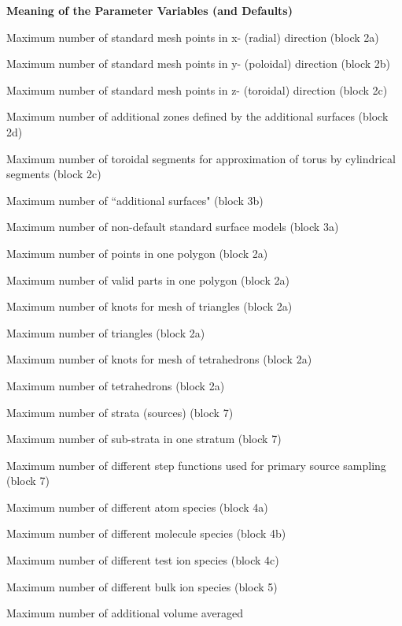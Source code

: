 {\bf Meaning of the Parameter Variables (and Defaults)}
\begin{list}{ }{}
\item[{\bf N1ST }]  Maximum number of standard mesh points in x-
(radial) direction (block 2a)
\item[{\bf N2ND }] Maximum number of standard mesh points in y-
(poloidal) direction (block 2b)
\item[{\bf N3RD }] Maximum number of standard mesh points in z-
(toroidal) direction (block 2c)
\item[{\bf NADD }] Maximum number of additional zones defined by the
additional surfaces (block 2d)
\item[{\bf NTOR }] Maximum number of toroidal segments for
approximation of torus by cylindrical segments (block 2c)
\item[{\bf NLIM }] Maximum number of ``additional surfaces" (block 3b)
\item[{\bf NSTS }] Maximum number of non-default standard surface
models (block 3a)
\item[{\bf NPLG }] Maximum number of points in one polygon (block 2a)
\item[{\bf NPPART }] Maximum number of valid parts in one polygon (block 2a)
\item[{\bf NKNOT }] Maximum number of knots for mesh of triangles (block 2a)
\item[{\bf NTRI }] Maximum number of triangles (block 2a)
\item[{\bf NCOORD }] Maximum number of knots for mesh of
tetrahedrons (block 2a)
\item[{\bf NTETRA }] Maximum number of tetrahedrons (block 2a)
\item[{\bf NSTRA }] Maximum number of strata (sources) (block 7)
\item[{\bf NSRFS }] Maximum number of sub-strata in one stratum (block 7)
\item[{\bf NSTEP }] Maximum number of different step functions used for
primary source sampling (block 7)
\item[{\bf NATM }] Maximum number of different atom species (block 4a)
\item[{\bf NMOL }] Maximum number of different molecule species (block 4b)
\item[{\bf NION }] Maximum number of different test ion species (block 4c)
\item[{\bf NPLS }] Maximum number of different bulk ion species (block 5)
\item[{\bf NADV }] Maximum number of additional volume averaged

\end{list}
